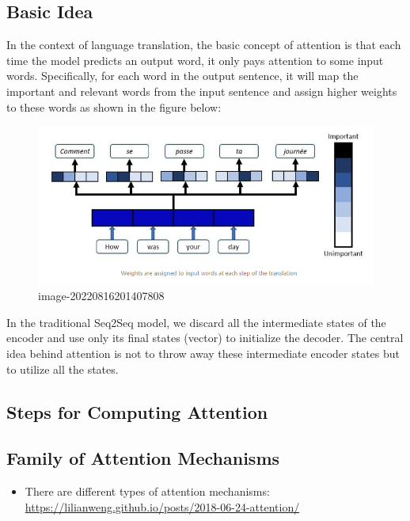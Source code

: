 \documentclass[
]{book}
\providecommand{\tightlist}{%
  \setlength{\itemsep}{0pt}\setlength{\parskip}{0pt}}
\begin{document}
\hypertarget{basic-idea}{%
\subsection{Basic Idea}\label{basic-idea}}

In the context of language translation, the basic concept of attention is that each time the model predicts an output word, it only pays attention to some input words. Specifically, for each word in the output sentence, it will map the important and relevant words from the input sentence and assign higher weights to these words as shown in the figure below:

\begin{figure}
\centering
\includegraphics{Figures/transformers_01.png}
\caption{image-20220816201407808}
\end{figure}

In the traditional Seq2Seq model, we discard all the intermediate states of the encoder and use only its final states (vector) to initialize the decoder. The central idea behind attention is not to throw away these intermediate encoder states but to utilize all the states.

\hypertarget{steps-for-computing-attention}{%
\subsection{Steps for Computing Attention}\label{steps-for-computing-attention}}

\hypertarget{family-of-attention-mechanisms}{%
\subsection{Family of Attention Mechanisms}\label{family-of-attention-mechanisms}}

\begin{itemize}
\tightlist
\item
  There are different types of attention mechanisms: \url{https://lilianweng.github.io/posts/2018-06-24-attention/}
\end{itemize}
\end{document}
